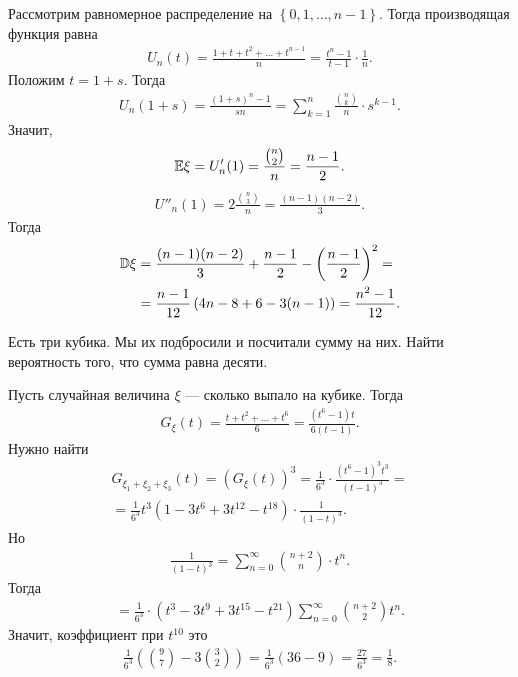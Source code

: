 \documentclass[../main.tex]{subfiles}
\begin{document}
\begin{exmpl}
 Рассмотрим равномерное распределение на $  \left\{ 0,1,\ldots,n-1 \right\} $. Тогда производящая функция равна
 \begin{align*}
  U_n(t) = \frac{1 + t + t^{2} + \ldots + t^{n-1}}{n} = \frac{t^{n}-1}{t-1} \cdot \frac{1}{n}.
 \end{align*} Положим $ t = 1 + s $. Тогда
 \begin{align*}
  U_n(1 + s) = \frac{(1+s)^{n} - 1}{sn} = \sum_{k=1}^{n} \frac{\binom n k}{n} \cdot s^{k-1}.
 \end{align*} Значит,
 \begin{align*}
  \mathbb E \xi = U'_n(1) = \frac{\binom n 2}{n} = \frac{n-1}{2}.
 \end{align*}
 \begin{align*}
  U''_n(1) = 2 \frac{\binom n 3}{n} = \frac{(n-1)(n-2)}{3}.
 \end{align*} Тогда
 \begin{align*}
  \mathbb D \xi &= \frac{(n-1)(n-2)}{3} + \frac{n-1}{2} - \left( \frac{n-1}{2} \right)^{2} = \\
  &= \frac{n - 1}{12} \left( 4n - 8 + 6 - 3(n - 1) \right) = \frac{n^{2}-1}{12}.
 \end{align*}
\end{exmpl}

\begin{exmpl}
 Есть три кубика. Мы их подбросили и посчитали сумму на них. Найти вероятность того, что сумма равна десяти.

 Пусть случайная величина $ \xi $ --- сколько выпало на кубике. Тогда
 \begin{align*}
  G_\xi(t) = \frac{t + t^{2} + \ldots + t^{6}}{6} = \frac{(t^{6}-1)t}{6(t-1)}.
 \end{align*} Нужно найти
 \begin{align*}
  G_{\xi_1 + \xi_2 + \xi_3}(t) = (G_\xi(t))^{3} = \frac{1}{6^{3}} \cdot \frac{(t^{6}-1)^{3}t^{3}}{(t-1)^{3}} = \\
  = \frac{1}{6^{3}} t^{3}(1 - 3t^{6} + 3t^{12} - t^{18}) \cdot \frac{1}{(1-t)^{3}}.
 \end{align*} Но
 \begin{align*}
  \frac{1}{(1-t)^{3}} = \sum_{n=0}^{\infty} \binom {n+2} n \cdot t^{n}.
 \end{align*} Тогда
 \begin{align*}
  =\frac{1}{6^{3}} \cdot (t^{3}-3t^{9}+3t^{15}-t^{21}) \sum_{n=0}^{\infty}\binom {n+2} 2 t^{n}.
 \end{align*} Значит, коэффициент при $ t^{10} $ это
 \begin{align*}
  \frac{1}{6^{3}} \left( \binom 9 7 - 3 \binom 3 2 \right) = \frac{1}{6^{3}} \left( 36 - 9 \right) = \frac{27}{6^{3}} = \frac{1}{8}.
 \end{align*}
\end{exmpl}
\end{document}
